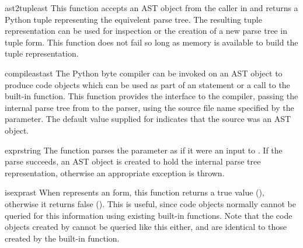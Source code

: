 
\begin{funcdesc}{ast2tuple}{ast}
This function accepts an AST object from the caller in
 and returns a Python tuple representing the
equivelent parse tree.  The resulting tuple representation can be used
for inspection or the creation of a new parse tree in tuple form.
This function does not fail so long as memory is available to build
the tuple representation.
\end{funcdesc}


\begin{funcdesc}{compileast}{ast}
The Python byte compiler can be invoked on an AST object to produce
code objects which can be used as part of an  statement or
a call to the built-in  function.  This function provides
the interface to the compiler, passing the internal parse tree from
 to the parser, using the source file name specified
by the  parameter.  The default value supplied
for  indicates that the source was an AST object.
\end{funcdesc}


\begin{funcdesc}{expr}{string}
The  function parses the parameter 
as if it were an input to .  If
the parse succeeds, an AST object is created to hold the internal
parse tree representation, otherwise an appropriate exception is
thrown.
\end{funcdesc}


\begin{funcdesc}{isexpr}{ast}
When  represents an  form, this function
returns a true value (), otherwise it returns false
().  This is useful, since code objects normally cannot be
queried for this information using existing built-in functions.  Note
that the code objects created by  cannot be queried
like this either, and are identical to those created by the built-in
 function.
\end{funcdesc}



